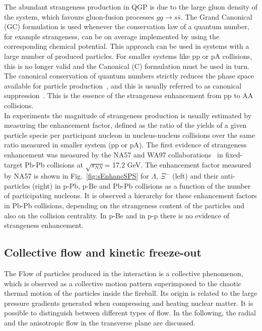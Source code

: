 The abundant strangeness production in QGP is due to the large gluon 
density of the system, which favours gluon-fusion processes
$gg \rightarrow s\bar{s}$. 
The Grand Canonical (GC) formulation is used whenever the conservation law of
a quantum number, for example strangeness, can be on average implemented by using
the corresponding chemical potential. This approach can be used in systems 
with a large number of produced particles. For smaller systems like pp or pA
collisions, this is no longer valid and the Canonical (C) formulation must be used
in turn. The canonical conservation of quantum numbers strictly reduces the phase
space available for particle production~\cite{Beutler:2009cc}, and this is usually referred to as canonical suppression~\cite{Tounsi:2001ck}.
This is the essence of the strangeness enhancement from pp to AA collisions.\\
In experiments the magnitude of strangeness production is usually estimated by measuring 
the enhancement factor, defined as the ratio of the yields of a given particle 
specie per participant nucleon in nucleus-nucleus collisions over the same 
ratio measured in smaller system (pp or pA). The first evidence of 
strangeness enhancement was measured by the NA57 and WA97 
collaborations~\cite{Sandor:2004bg} in fixed-target Pb-Pb collisions at 
$\sqrt{s_{NN}}$= 17.2 GeV. The enhancement factor measured by NA57 
is shown in Fig.~\ref{fig:sEnhancSPS} for $\Lambda$, $\Xi^-$ (left) and 
their anti-particles (right) in p-Pb, p-Be and Pb-Pb collisions as a function 
of the number of participating nucleons. It is observed a hierarchy for these 
enhancement factors in Pb-Pb collisions, depending on the strangeness
 content of the particles and also on the collision centrality. In p-Be and in 
 p-p there is no evidence of strangeness enhancement. 

\subsection{Collective flow and kinetic freeze-out}
The Flow of particles produced in the interaction is a collective phenomenon, which is observed as a collective 
motion pattern superimposed to the chaotic thermal motion of the 
particles inside the fireball. Its origin is related to the large pressure gradients 
generated when compressing and heating nuclear matter. It is possible 
to distinguish between different types of flow. In the following, 
the radial and the anisotropic flow in the transverse plane are discussed. 

